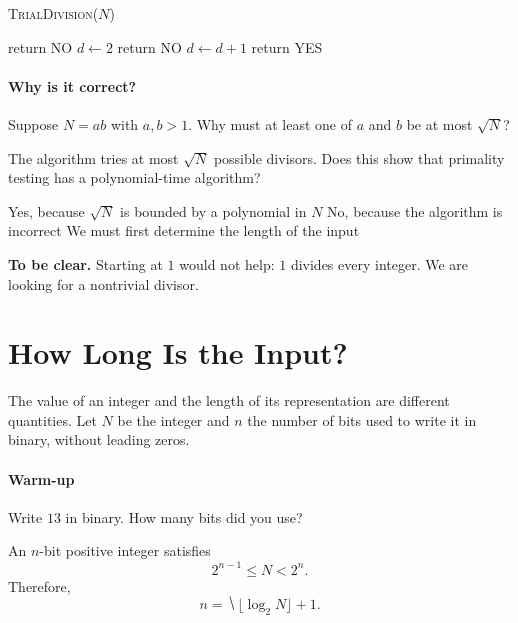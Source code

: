\documentclass[11  pt]{article}
\begin{document}
\begin{algorithm}[h]
    \textsc{TrialDivision}($N$)
    \begin{algorithmic}
            \State return NO
        \EndIf
        \State $d\gets 2$
                \State return NO
            \EndIf
            \State $d\gets d+1$
        \EndWhile
        \State return YES
    \end{algorithmic}
\end{algorithm}

\paragraph{Why is it correct?}
Suppose $N=ab$ with $a,b>1$. Why must at least one of $a$ and $b$ be at most $\sqrt N$?
\vs{1.5cm}

\begin{Qu}
    The algorithm tries at most $\sqrt N$ possible divisors. Does this show that primality testing has a polynomial-time algorithm?
    \begin{itemize}
        \aitem Yes, because $\sqrt N$ is bounded by a polynomial in $N$
        \bitem No, because the algorithm is incorrect
        \citem We must first determine the length of the input
    \end{itemize}
\end{Qu}

\vfill
\textbf{To be clear.} Starting at $1$ would not help: $1$ divides every integer. We are looking for a nontrivial divisor.

\newpage
\section{How Long Is the Input?}
The value of an integer and the length of its representation are different quantities. Let $N$ be the integer and $n$ the number of bits used to write it in binary, without leading zeros.

\paragraph{Warm-up}
Write $13$ in binary. How many bits did you use?
\vs{1cm}

An $n$-bit positive integer satisfies
\begin{equation*}
    2^{n-1}\leq N<2^n.
\end{equation*}
Therefore,
\begin{equation*}
    n=\hide{\lfloor\log_2 N\rfloor+1}.
\end{equation*}
\end{document}
